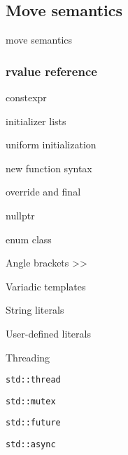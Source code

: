 \documentclass[presentation]{beamer}
\begin{document}
\subsection{Move semantics}
\begin{frame}[label={sec:orgheadline6}]{move semantics}
\end{frame}
\begin{frame}
  \frametitle{rvalue reference}
\end{frame}
\begin{frame}[label={sec:orgheadline7}]{constexpr}
\end{frame}
\begin{frame}[label={sec:orgheadline8}]{initializer lists}
\end{frame}
\begin{frame}[label={sec:orgheadline9}]{uniform initialization}
\end{frame}
\begin{frame}[label={sec:orgheadline10}]{new function syntax}
\end{frame}
\begin{frame}[label={sec:orgheadline11}]{override and final}
\end{frame}
\begin{frame}[label={sec:orgheadline12}]{nullptr}
\end{frame}
\begin{frame}[label={sec:orgheadline13}]{enum class}
\end{frame}
\begin{frame}[label={sec:orgheadline14}]{Angle brackets >>}
\end{frame}
\begin{frame}[label={sec:orgheadline16}]{Variadic templates}
\end{frame}
\begin{frame}[label={sec:orgheadline17}]{String literals}
\end{frame}
\begin{frame}[label={sec:orgheadline18}]{User-defined literals}
\end{frame}
\begin{frame}[fragile,label={sec:orgheadline19}]{Threading}
 \begin{block}{\texttt{std::thread}}
\end{block}
\begin{block}{\texttt{std::mutex}}
\end{block}
\begin{block}{\texttt{std::future}}
\end{block}
\begin{block}{\texttt{std::async}}
\end{block}
\end{frame}
\end{document}
